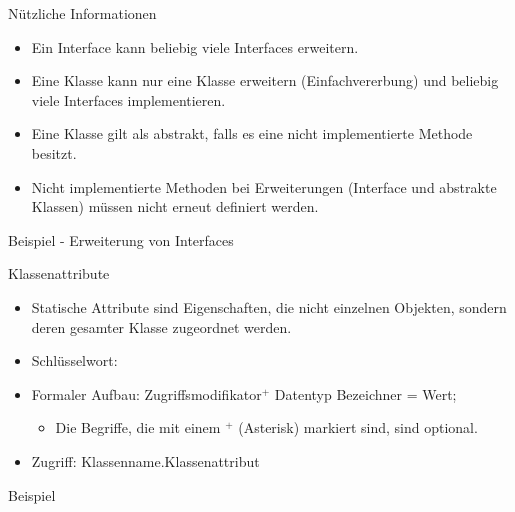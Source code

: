 \documentclass{../tuda-beamer}
\begin{document}
  \begin{frame}{Nützliche Informationen}
    \begin{itemize}
      \item Ein Interface kann beliebig viele Interfaces erweitern.
      \item Eine Klasse kann nur eine Klasse erweitern (Einfachvererbung) und beliebig viele
      Interfaces implementieren.
      \item Eine Klasse gilt als abstrakt, falls es eine nicht implementierte Methode besitzt.
      \item Nicht implementierte Methoden bei Erweiterungen (Interface und abstrakte Klassen)
      müssen nicht erneut definiert werden.
    \end{itemize}
  \end{frame}

  \begin{frame}[c]{Beispiel - Erweiterung von Interfaces}
    
  \end{frame}

  \begin{frame}[c]
    
  \end{frame}

  \begin{frame}{Klassenattribute}
    \begin{itemize}
      \item Statische Attribute sind Eigenschaften, die nicht einzelnen Objekten, sondern deren
      gesamter Klasse zugeordnet werden.
      \item Schlüsselwort: 
      \item Formaler Aufbau: Zugriffsmodifikator\(^+\)  Datentyp Bezeichner =
      Wert;
      \begin{itemize}
        \item Die Begriffe, die mit einem \(^+\) (Asterisk) markiert sind, sind optional.
      \end{itemize}
      \item Zugriff: Klassenname.Klassenattribut
    \end{itemize}
  \end{frame}

  \begin{frame}[c]{Beispiel}
    
  \end{frame}
\end{document}

